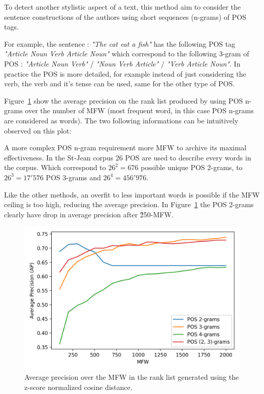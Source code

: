To detect another stylistic aspect of a text, this method aim to consider the sentence constructions of the authors using short sequences (n-grams) of POS tags.

For example, the sentence : \textit{"The cat eat a fish"} has the following POS tag \textit{"Article Noun Verb Article Noun"} which correspond to the following 3-gram of POS : \textit{"Article Noun Verb"} / \textit{"Noun Verb Article"} / \textit{"Verb Article Noun"}.
In practice the POS is more detailed, for example instead of just considering the verb, the verb and it's tense can be used, same for the other type of POS.

Figure~\ref{fig:pos_ngrams} show the average precision on the rank list produced by using POS n-grams over the number of MFW (most frequent word, in this case POS n-grams are considered as words).
The two following informations can be intuitively observed on this plot:

A more complex POS n-gram requirement more MFW to archive its maximal effectiveness.
In the St-Jean corpus 26 POS are used to describe every words in the corpus.
Which correspond to $26^2 = 676$ possible unique POS 2-grams, to $26^3 = 17'576$ POS 3-grams and $26^4 = 456'976$.

Like the other methods, an overfit to less important words is possible if the MFW ceiling is too high, reducing the average precision.
In Figure~\ref{fig:pos_ngrams} the POS 2-grams clearly have drop in average precision after \~250-MFW.

\begin{figure}
  \includegraphics[width=\linewidth]{img/pos_ngrams.png}
  \caption{Average precision over the MFW in the rank list generated using the z-score normalized cosine distance.}
  \label{fig:pos_ngrams}
\end{figure}


